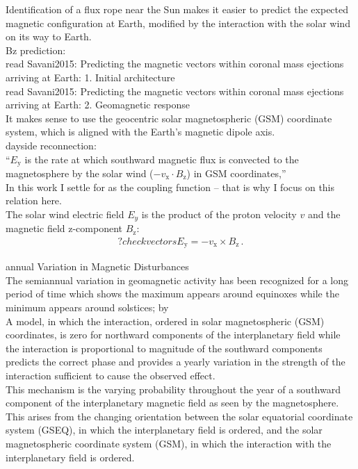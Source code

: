 Identification of a flux rope near the Sun makes it easier to predict the expected magnetic configuration at Earth, modified by the interaction with the solar wind on its way to Earth.\\

Bz prediction:\\
read Savani2015: Predicting the magnetic vectors within coronal mass ejections arriving at Earth: 1. Initial architecture\\
read Savani2015: Predicting the magnetic vectors within coronal mass ejections arriving at Earth: 2. Geomagnetic response\\


It makes sense to use the geocentric solar magnetospheric (GSM) coordinate system, which is aligned with the Earth's magnetic dipole axis.\\

dayside reconnection:\\
``$E_\text{y}$ is the rate at which southward magnetic flux is convected to the magnetosphere by the solar wind ($-v_\text{x} \cdot B_\text{z}$) in GSM coordinates,'' \citep{Russell2007}\\

In this work I settle for \vBz{} as the coupling function -- that is why I focus on this relation here.\\

The solar wind electric field $E_y$ is the product of the proton velocity $v$ and the magnetic field z-component $B_\text{z}$:
\begin{align}
	?check vectors  E_\text{y} = -v_\text{x} \times B_\text{z}\,.	\label{eq:coupling_vxBz}
\end{align}


annual Variation in Magnetic Disturbances\\
The semiannual variation in geomagnetic activity has been recognized for a long period of time which shows the maximum appears around equinoxes while the minimum appears around solstices; by \citep{Cortie1912}\\

A model, in which the interaction, ordered in solar magnetospheric (GSM) coordinates, is zero for northward components of the interplanetary field while the interaction is proportional to magnitude of the southward components predicts the correct phase and provides a yearly variation in the strength of the interaction sufficient to cause the observed effect. \citep{Russell1973}\\
This mechanism is the varying probability throughout the year of a southward component of the interplanetary magnetic field as seen by the magnetosphere. This arises from the changing orientation between the solar equatorial coordinate system (GSEQ), in which the interplanetary field is ordered, and the solar magnetospheric coordinate system (GSM), in which the interaction with the interplanetary field is ordered. \citep{Russell1973}\\


